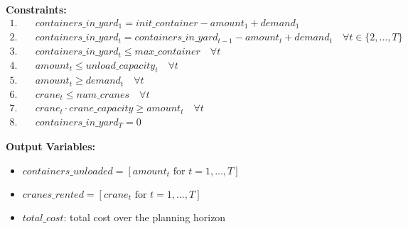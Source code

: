 \documentclass{article}
\begin{document}
\textbf{Constraints:}
\begin{align*}
1. & \quad containers\_in\_yard_1 = init\_container - amount_1 + demand_1 \\
2. & \quad containers\_in\_yard_t = containers\_in\_yard_{t-1} - amount_t + demand_t \quad \forall t \in \{2, \ldots, T\} \\
3. & \quad containers\_in\_yard_t \leq max\_container \quad \forall t \\
4. & \quad amount_t \leq unload\_capacity_t \quad \forall t \\
5. & \quad amount_t \geq demand_t \quad \forall t \\
6. & \quad crane_t \leq num\_cranes \quad \forall t \\
7. & \quad crane_t \cdot crane\_capacity \geq amount_t \quad \forall t \\
8. & \quad containers\_in\_yard_T = 0
\end{align*}

\textbf{Output Variables:}
\begin{itemize}
    \item $containers\_unloaded = [amount_t \text{ for } t = 1, \ldots, T]$
    \item $cranes\_rented = [crane_t \text{ for } t = 1, \ldots, T]$
    \item $total\_cost$: total cost over the planning horizon
\end{itemize}
\end{document}
